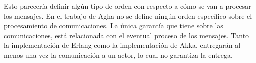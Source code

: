 
Esto parecería definir algún tipo de orden con respecto a cómo se van a procesar los mensajes. En el trabajo de Agha\cite{Agha:1986:AMC:7929} no se define ningún orden específico sobre el procesamiento de comunicaciones. La única garantía que tiene sobre las comunicaciones, está relacionada con el eventual proceso de los mensajes. Tanto la implementación de Erlang\cite{Cesarini:2009:EP:1717841} como la implementación de Akka\cite{Wyatt:2013:AC:2663429}, entregarán al menos una vez la comunicación a un actor, lo cual no garantiza la entrega.


